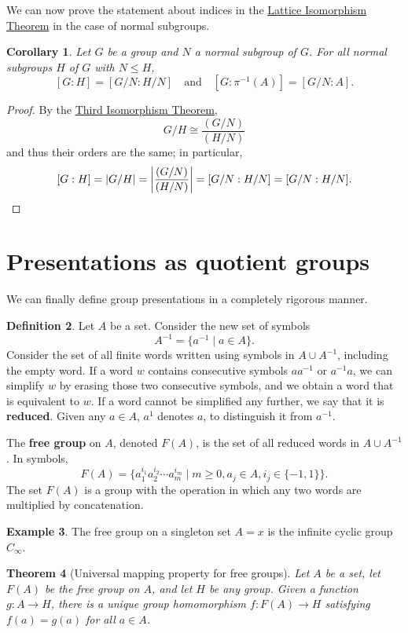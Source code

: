 \documentclass[12pt]{report}
\newtheorem{theorem}{Theorem}[chapter]
\newtheorem{corollary}[theorem]{Corollary}
\numberwithin{equation}{section}
\numberwithin{theorem}{chapter}
\theoremstyle{definition}
\newtheorem{definition}[theorem]{Definition}
\newtheorem{example}[theorem]{Example}
\newtheorem*{basic properties}{Basic Properties}
\newtheorem*{Important Remark}{Important Remark}
\newcommand{\df}[1]{{\bf #1}\index{#1}}
\begin{document}
We can now prove the statement about indices in the \hyperref[Lattice Isomorphism Theorem]{Lattice Isomorphism Theorem} in the case of normal subgroups. 

\begin{corollary}
Let $G$ be a group and $N$ a normal subgroup of $G$. For all normal subgroups $H$ of $G$ with $N \leq H$,
$$[G:H] = [G/N : H/N] \quad \textrm{and} \quad [G: \pi^{-1}(A)] = [G/N : A].$$
\end{corollary}

\begin{proof}
By the \hyperref[Third Isomorphism Theorem]{Third Isomorphism Theorem},
$$G/H \cong \frac{(G/N)}{(H/N)}$$
and thus their orders are the same; in particular,
$$[G:H] = |G/H| = \left| \frac{(G/N)}{(H/N)} \right| = [G/N: H/N]=[G/N : H/N].\qedhere$$
\end{proof}


\newpage

\section{Presentations as quotient groups}

We can finally define group presentations in a completely rigorous manner.

\begin{definition}
Let $A$ be a set. Consider the new set of symbols 
$$A^{-1}=\{a^{-1} \mid a \in A\}.$$
Consider the set of all finite words written using symbols in $A \cup A^{-1}$, including the empty word. If a word $w$ contains consecutive symbols $a a^{-1}$ or $a^{-1}a$, we can simplify $w$ by erasing those two consecutive symbols, and we obtain a word that is equivalent to $w$. If a word cannot be simplified any further, we say that it is {\bf reduced}. Given any $a \in A$, $a^1$ denotes $a$, to distinguish it from $a^{-1}$. 

The \df{free group} on $A$, denoted $F(A)$, is the set of all reduced words in $A \cup A^{-1}$. 
In symbols,
$$F(A)=\{a_1^{i_1}a_2^{i_2}\cdots a_m^{i_m} \mid m \geqslant 0, a_j\in A, i_j\in\{-1,1\}\}.$$
The set $F(A)$ is a group with the operation in which any two words are multiplied by concatenation. 
\end{definition}

\begin{example}
The free group on a singleton set $A={x}$ is the infinite cyclic group $C_\infty$.
\end{example}

\begin{theorem}[Universal mapping property for free groups]\label{universal mapping property free groups}
 Let $A$ be a set, let $F(A)$ be the free group on $A$, and let $H$ be any group. Given a function $g\! :A \to H$, there is a unique group homomorphism $f\!:F(A) \to H$ satisfying $f(a) = g(a)$ for all $a \in A$.
 \end{theorem}
\end{document}
